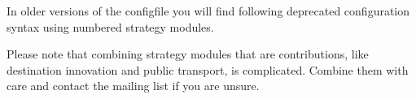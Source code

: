 In older versions of the \gls{configfile} you will find following deprecated configuration syntax using numbered strategy modules.
%
%
%
%
%


Please note that combining strategy modules that are \glspl{contribution}, like destination innovation and public transport, is complicated. Combine them with care and contact the mailing list if you are unsure.

%

